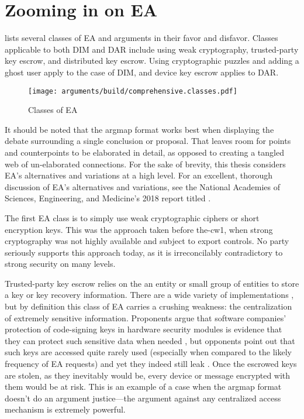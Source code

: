 \section{Zooming in on EA}

 lists several classes of \ac{EA} and arguments in their favor and disfavor. Classes applicable
to both \ac{DIM} and \ac{DAR} include using weak cryptography, trusted-party key escrow, and distributed key escrow.
Using cryptographic puzzles and adding a ghost user apply to the case of \ac{DIM}, and device key escrow applies to
\ac{DAR}.

\begin{sidewaysfigure}[p!]
  \centering\CaptionFontSize
  \texttt{[image: arguments/build/comprehensive.classes.pdf]}
  \caption{Classes of EA}
  \label{fig-arg-classes}
\end{sidewaysfigure}

It should be noted that the \ac{argmap} format works best when displaying the debate surrounding a single conclusion or
proposal. That leaves room for points and counterpoints to be elaborated in detail, as opposed to creating a tangled web
of un-elaborated connections. For the sake of brevity, this thesis considers \ac{EA}'s alternatives and variations at a
high level. For an excellent, thorough discussion of \ac{EA}'s alternatives and variations, see the National Academies
of Sciences, Engineering, and Medicine's 2018 report titled  \cite{committee_decrypting_2018}.

The first \ac{EA} class is to simply use weak cryptographic ciphers or short encryption keys. This was the approach
taken before \ac{the-cw1}, when strong cryptography was not highly available and subject to export controls. No party
seriously supports this approach today, as it is irreconcilably contradictory to strong security on many levels.

Trusted-party key escrow relies on the an entity or small group of entities to store a key or key recovery information.
There are a wide variety of implementations \cite{denning_taxonomy_1996}, but by definition this class of \ac{EA}
carries a crushing weakness: the centralization of extremely sensitive information. Proponents argue that software
companies' protection of code-signing keys in hardware security modules is evidence that they can protect such sensitive
data when needed \cite{ozzie_2018}, but opponents point out that such keys are accessed quite rarely used (especially
when compared to the likely frequency of \ac{EA} requests) and yet they indeed still leak \cite{green_2018}. Once the
escrowed keys are stolen, as they inevitably would be, every device or message encrypted with them would be at risk.
This is an example of a case when the \ac{argmap} format doesn't do an argument justice---the argument against any
centralized access mechanism is extremely powerful.

